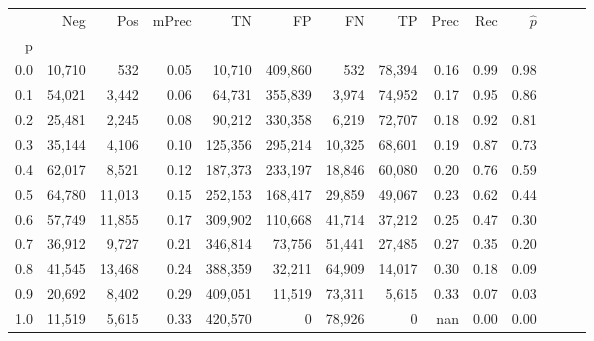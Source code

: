 \begin{tabular}{rrrrrrrrrrrrrr}
\toprule
{} &     Neg &     Pos & mPrec &       TN &       FP &      FN &      TP &  Prec &   Rec & $\hat{p}$ \\
p   &         &         &       &          &          &         &         &       &       &           \\
\midrule
0.0 &  10,710 &     532 &  0.05 &   10,710 &  409,860 &     532 &  78,394 &  0.16 &  0.99 &      0.98 \\
0.1 &  54,021 &   3,442 &  0.06 &   64,731 &  355,839 &   3,974 &  74,952 &  0.17 &  0.95 &      0.86 \\
0.2 &  25,481 &   2,245 &  0.08 &   90,212 &  330,358 &   6,219 &  72,707 &  0.18 &  0.92 &      0.81 \\
0.3 &  35,144 &   4,106 &  0.10 &  125,356 &  295,214 &  10,325 &  68,601 &  0.19 &  0.87 &      0.73 \\
0.4 &  62,017 &   8,521 &  0.12 &  187,373 &  233,197 &  18,846 &  60,080 &  0.20 &  0.76 &      0.59 \\
0.5 &  64,780 &  11,013 &  0.15 &  252,153 &  168,417 &  29,859 &  49,067 &  0.23 &  0.62 &      0.44 \\
0.6 &  57,749 &  11,855 &  0.17 &  309,902 &  110,668 &  41,714 &  37,212 &  0.25 &  0.47 &      0.30 \\
0.7 &  36,912 &   9,727 &  0.21 &  346,814 &   73,756 &  51,441 &  27,485 &  0.27 &  0.35 &      0.20 \\
0.8 &  41,545 &  13,468 &  0.24 &  388,359 &   32,211 &  64,909 &  14,017 &  0.30 &  0.18 &      0.09 \\
0.9 &  20,692 &   8,402 &  0.29 &  409,051 &   11,519 &  73,311 &   5,615 &  0.33 &  0.07 &      0.03 \\
1.0 &  11,519 &   5,615 &  0.33 &  420,570 &        0 &  78,926 &       0 &   nan &  0.00 &      0.00 \\
\bottomrule
\end{tabular}

